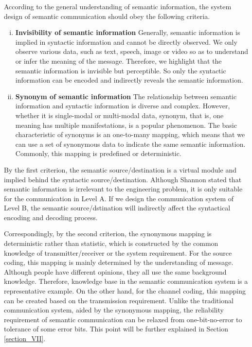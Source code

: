 \documentclass[12pt, draftclsnofoot,onecolumn]{IEEEtran}
\begin{document}
According to the general understanding of semantic information, the system design of semantic communication should obey the following criteria.
\begin{enumerate}[(i)]
  \item  \textbf{Invisibility of semantic information}
  Generally, semantic information is implied in syntactic information and cannot be directly observed. We only observe various data, such as text, speech, image or video so as to understand or infer the meaning of the message. Therefore, we highlight that the semantic information is invisible but perceptible. So only the syntactic information can be encoded and indirectly reveals the semantic information.
  \item  \textbf{Synonym of semantic information}
  The relationship between semantic information and syntactic information is diverse and complex. However, whether it is single-modal or multi-modal data, synonym, that is, one meaning has multiple manifestations, is a popular phenomenon. The basic characteristic of synonyms is an one-to-many mapping, which means that we can use a set of synonymous data to indicate the same semantic information. Commonly, this mapping is predefined or deterministic.
\end{enumerate}

By the first criterion, the semantic source/destination is a virtual module and implied behind the syntactic source/destination. Although Shannon stated that semantic information is irrelevant to the engineering problem, it is only suitable for the communication in Level A. If we design the communication system of Level B, the semantic source/dstination will indirectly affect the syntactical encoding and decoding process.

Correspondingly, by the second criterion, the synonymous mapping is deterministic rather than statistic, which is constructed by the common knowledge of transmitter/receiver or the system requirement. For the source coding, this mapping is mainly determined by the understanding of message. Although people have different opinions, they all use the same background knowledge. Therefore, knowledge base in the semantic communication system is a representative example. On the other hand, for the channel coding, this mapping can be created based on the transmission requirement. Unlike the traditional communication system, aided by the synonymous mapping, the reliability requirement of semantic communication can be relaxed from one-bit-no-error to tolerance of some error bits. This point will be further explained in Section \ref{section_VII}.
\end{document}

